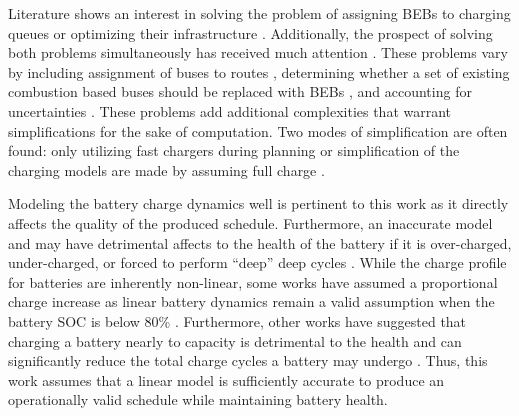 \documentclass[energies,article,submit,moreauthors]{Definitions/mdpi}
\begin{document}
Literature shows an interest in solving the problem of assigning BEBs to charging queues or optimizing their
infrastructure \cite{wei-2018-optim-spatio,sebastiani-2016-evaluat-elect,hoke-2014-accoun-lithium,wang-2017-elect-vehic}. Additionally, the prospect of solving both problems simultaneously
has received much attention \cite{wei-2018-optim-spatio,sebastiani-2016-evaluat-elect,hoke-2014-accoun-lithium,wang-2017-elect-vehic}. These problems vary by including assignment of buses to routes
\cite{rinaldi-2020-mixed-fleet,zhou-2020-collab-optim,tang-2019-robus-sched,li-2014-trans-bus}, determining
whether a set of existing combustion based buses should be replaced with BEBs \cite{zhou-2020-bi-objec,duan-2021-refor-mixed,rinaldi-2020-mixed-fleet,zhou-2020-collab-optim}, and accounting for uncertainties
\cite{bie-2021-optim-elect,duan-2021-refor-mixed,tang-2019-robus-sched,ursavas-2016-optim-polic}. These problems
add additional complexities that warrant simplifications for the sake of computation. Two modes of simplification are
often found: only utilizing fast chargers during planning \cite{li-2014-trans-bus,li-2014-trans-bus,wang-2017-optim-rechar} or simplification of the charging models are made by assuming full charge
\cite{zhou-2020-bi-objec,qarebagh-2019-optim-sched,wei-2018-optim-spatio}.

Modeling the battery charge dynamics well is pertinent to this work as it directly affects the quality of the produced
schedule. Furthermore, an inaccurate model and may have detrimental affects to the health of the battery if it is
over-charged, under-charged, or forced to perform ``deep'' deep cycles \cite{zhou-2020-bi-objec,millner-2010-model-lithium,edge-2021-lithium}. While the charge profile for batteries are inherently non-linear, some
works have assumed a proportional charge increase as linear battery dynamics remain a valid assumption when the battery
SOC is below 80\% \cite{liu-2020-batter-elect}. Furthermore, other works have suggested that charging a battery nearly
to capacity is detrimental to the health and can significantly reduce the total charge cycles a battery may undergo
\cite{edge-2021-lithium,millner-2010-model-lithium}. Thus, this work assumes that a linear model is sufficiently
accurate to produce an operationally valid schedule while maintaining battery health.
\end{document}
